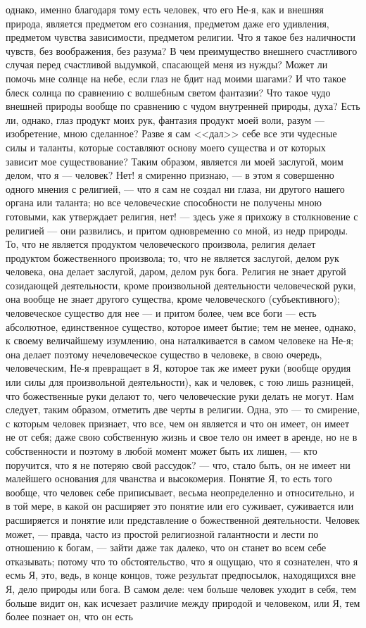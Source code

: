 \documentclass[12pt]{article}
\begin{document}
однако, именно благодаря тому есть человек, что его Не-я, как и внешняя природа, является предметом его сознания, предметом даже его удивления, предметом чувства зависимости, предметом религии. Что я такое без наличности чувств, без воображения, без разума? В чем преимущество внешнего счастливого случая перед счастливой выдумкой, спасающей меня из нужды? Может ли помочь мне солнце на небе, если глаз не бдит над моими шагами? И что такое блеск солнца по сравнению с волшебным светом фантазии? Что такое чудо внешней природы вообще по сравнению с чудом внутренней природы, духа? Есть ли, однако, глаз продукт моих рук, фантазия продукт моей воли, разум --- изобретение, мною сделанное? Разве я сам <<дал>> себе все эти чудесные силы и таланты, которые составляют основу моего существа и от которых зависит мое существование? Таким образом, является ли моей заслугой, моим делом, что я --- человек? Нет! я смиренно признаю, --- в этом я совершенно одного мнения с религией, --- что я сам не создал ни глаза, ни другого нашего органа или таланта; но все человеческие способности не получены мною готовыми, как утверждает религия, нет! --- здесь уже я прихожу в столкновение с религией --- они развились, и притом одновременно со мной, из недр природы. То, что не является продуктом человеческого произвола, религия делает продуктом божественного произвола; то, что не является заслугой, делом рук человека, она делает заслугой, даром, делом рук бога. Религия не знает другой созидающей деятельности, кроме произвольной деятельности человеческой руки, она вообще не знает другого существа, кроме человеческого (субъективного); человеческое существо для нее --- и притом более, чем все боги --- есть абсолютное, единственное существо, которое имеет бытие; тем не менее, однако, к своему величайшему изумлению, она наталкивается в самом человеке на Не-я; она делает поэтому нечеловеческое существо в человеке, в свою очередь, человеческим, Не-я превращает в Я, которое так же имеет руки (вообще орудия или силы для произвольной деятельности), как и человек, с тою лишь разницей, что божественные руки делают то, чего человеческие руки делать не могут. Нам следует, таким образом, отметить две черты в религии. Одна, это --- то смирение, с которым человек признает, что все, чем он является и что он имеет, он имеет не от себя; даже свою собственную жизнь и свое тело он имеет в аренде, но не в собственности и поэтому в любой момент может быть их лишен, --- кто поручится, что я не потеряю свой рассудок? --- что, стало быть, он не имеет ни малейшего основания для чванства и высокомерия. Понятие Я, то есть того вообще, что человек себе приписывает, весьма неопределенно и относительно, и в той мере, в какой он расширяет это понятие или его суживает, суживается или расширяется и понятие или представление о божественной деятельности. Человек может, --- правда, часто из простой религиозной галантности и лести по отношению к богам, --- зайти даже так далеко, что он станет во всем себе отказывать; потому что то обстоятельство, что я ощущаю, что я сознателен, что я есмь Я, это, ведь, в конце концов, тоже результат предпосылок, находящихся вне Я, дело природы или бога. В самом деле: чем больше человек уходит в себя, тем больше видит он, как исчезает различие между природой и человеком, или Я, тем более познает он, что он есть 
\end{document}
